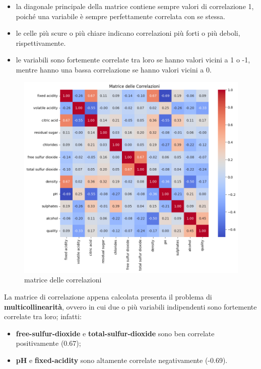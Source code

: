 \documentclass{article}
\begin{document}
\begin{titlepage}
        \begin{itemize}
            \item la diagonale principale della matrice contiene sempre valori di correlazione 1, poiché una variabile è sempre perfettamente correlata con se stessa.
            \item le celle più scure o più chiare indicano correlazioni più forti o più deboli, rispettivamente.
            \item le variabili sono fortemente correlate tra loro se hanno valori vicini a 1 o -1, mentre hanno una bassa correlazione se hanno valori vicini a 0.
        \end{itemize}

        \begin{figure}[ht]
            \centering
            \includegraphics[width=0.6\linewidth]{correlation-matrix.png}
            \caption{  matrice delle correlazioni}
            \label{fig:enter-label}
        \end{figure}

        \newpage
        La matrice di correlazione appena calcolata presenta il problema di \textbf{multicollinearità}, ovvero in cui due o più variabili indipendenti sono fortemente correlate tra loro; infatti:
        \begin{itemize}
            \item \textbf{free-sulfur-dioxide} e \textbf{total-sulfur-dioxide} sono ben correlate positivamente (0.67);
            \item\textbf{pH} e \textbf{fixed-acidity} sono altamente correlate negativamente (-0.69).
        \end{itemize}


\end{titlepage}
\end{document}
